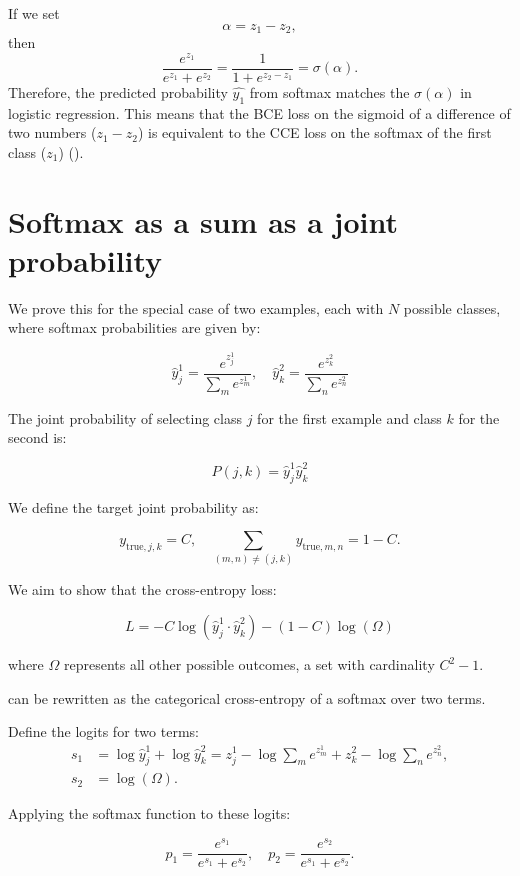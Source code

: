 \documentclass[twoside,11pt]{article}
\begin{document}
If we set 
\[
  \alpha = z_1 - z_2,
\]
then
\[
  \frac{e^{z_1}}{e^{z_1} + e^{z_2}}
  =
  \frac{1}{1 + e^{z_2 - z_1}}
  =
  \sigma(\alpha).
\] 
Therefore, the predicted probability $\hat{y_1}$ from softmax
matches the \(\sigma(\alpha)\) in logistic regression. This means that 
the BCE loss on the sigmoid of a difference of two numbers ($z_1 - z_2$) 
is equivalent
to the CCE loss on the softmax of the first class
($z_1$) (\cite{Goodfellow-et-al-2016}).


\section{Softmax as a sum as a joint probability}
\label{app:softmax-sum-joint}

We prove this for the special case of two examples, each with $N$ 
possible classes, where softmax probabilities are given by:

\[
\hat{y}_j^1 = \frac{e^{z_j^1}}{\sum_{m} e^{z_m^1}}, \quad \hat{y}_k^2 = \frac{e^{z_k^2}}{\sum_{n} e^{z_n^2}}
\]

The joint probability of selecting class $j$ for the first example and class $k$ for the second is:

\[
P(j, k) = \hat{y}_j^1 \hat{y}_k^2
\]

We define the target joint probability as:

\[
y_{\text{true}, j, k} 
= 
C, \quad \sum_{(m,n) \neq (j,k)} y_{\text{true}, m, n} = 1 - C.
\]

We aim to show that the cross-entropy loss:

\[
L = - C \log (\hat{y}_j^1 \cdot \hat{y}_k^2) - (1 - C) \log (\Omega)
\]

where $\Omega$ represents all other possible outcomes, 
a set with cardinality $C^2 - 1$.

can be rewritten as the categorical cross-entropy of a softmax over two terms.

Define the logits for two terms:
\begin{align}
  \nonumber
  s_1 &= \log \hat{y}_j^1 + \log \hat{y}_k^2 = z_j^1 - \log \sum_m e^{z_m^1} + z_k^2 - \log \sum_n e^{z_n^2}, \\
  \nonumber
  s_2 &= \log (\Omega).
\end{align}

Applying the softmax function to these logits:

\[
p_1 = \frac{e^{s_1}}{e^{s_1} + e^{s_2}}, \quad p_2 = \frac{e^{s_2}}{e^{s_1} + e^{s_2}}.
\]
\end{document}
